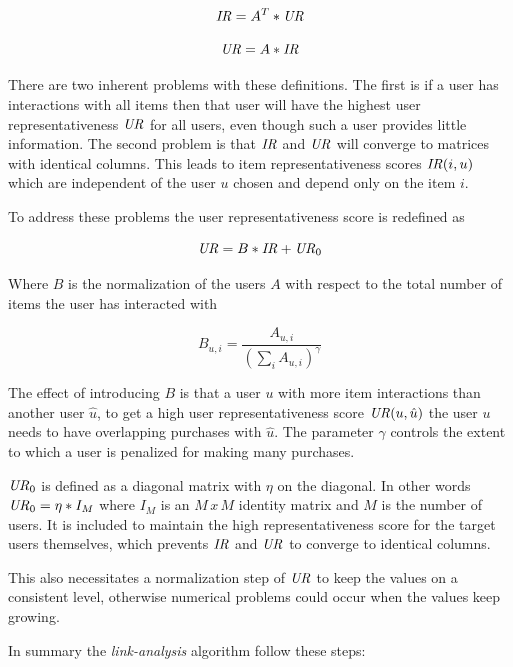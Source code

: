 \begin{equation}
    \mathit{IR} = A^T * \mathit{UR}
\end{equation}

\begin{equation}
    \mathit{UR} = A * \mathit{IR}
\end{equation}

There are two inherent problems with these definitions. The first is if a user has interactions with all items then that user will have the highest user representativeness $\mathit{UR}$ for all users, even though such a user provides little information. The second problem is that $\mathit{IR}$ and $\mathit{UR}$ will converge to matrices with identical columns. This leads to item representativeness scores $\mathit{IR}(i, u)$ which are independent of the user $u$ chosen and depend only on the item $i$.  \cite{huang2004link, huang2007comparison}

To address these problems the user representativeness score is redefined \cite{huang2007comparison} as

\begin{equation}
    \mathit{UR} = B * \mathit{IR} + \mathit{UR}_0
\end{equation}

Where $B$ is the normalization of the users $A$ with respect to the total number of items the user has interacted with

\begin{equation}
    B_{u, i} = \frac{ A_{u, i} }{ \left(\sum_{i} A_{u, i}\right)^\gamma }
\end{equation}

The effect of introducing $B$ is that a user $u$ with more item interactions than another user $\hat{u}$, to get a high user representativeness score $\mathit{UR}(u, \hat{u})$ the user $u$ needs to have overlapping purchases with $\hat{u}$. The parameter $\gamma$ controls the extent to which a user is penalized for making many purchases.

$\mathit{UR}_0$ is defined as a diagonal matrix with $\eta$ on the diagonal. In other words $\mathit{UR}_0 = \eta * I_M$ where $I_M$ is an $M\,x\,M$ identity matrix and $M$ is the number of users. It is included to maintain the high representativeness score for the target users themselves, which prevents $\mathit{IR}$ and $\mathit{UR}$ to converge to identical columns.

This also necessitates a normalization step of $\mathit{UR}$ to keep the values on a consistent level, otherwise numerical problems could occur when the values keep growing.

In summary the \textit{link-analysis} algorithm follow these steps:

